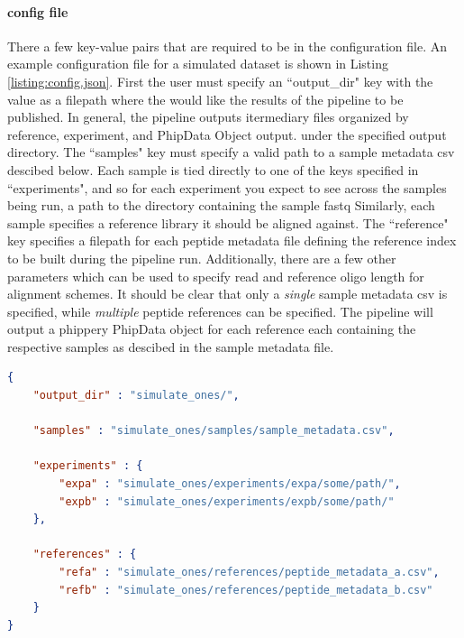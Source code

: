 \documentclass{article}
\begin{document}
\paragraph{config file}
There a few key-value pairs that are required to be in the configuration file. 
An example configuration file for a simulated dataset is shown in Listing \ref{listing:config.json}.
First the user must specify an ``output\_dir" key with the value as a filepath where the would like the results of the pipeline to be published.
In general, the pipeline outputs itermediary files organized by reference, experiment, and PhipData Object output.
under the specified output directory. The ``samples" key must specify a valid path to a sample metadata csv descibed below. 
Each sample is tied directly to one of the keys specified in ``experiments", 
and so for each experiment you expect to see across the samples being run, a path to the directory containing the sample fastq 
Similarly, each sample specifies a reference library it should be aligned against.
The ``reference" key specifies a filepath for each peptide metadata file defining the reference index to be built during the pipeline run.
Additionally, there are a few other parameters which can be used to specify read and reference oligo length for alignment schemes.
It should be clear that only a \textit{single} sample metadata csv is specified, while \textit{multiple} peptide references can be specified.
The pipeline will output a phippery PhipData object for each reference each containing the respective samples as descibed in the sample metadata file.

\begin{lstlisting}[language=json,firstnumber=1,caption={An example JSON configuration file for a simulated dataset.},captionpos=b,numbers=none,label=listing:config.json]
{
    "output_dir" : "simulate_ones/",

    "samples" : "simulate_ones/samples/sample_metadata.csv",

    "experiments" : {
        "expa" : "simulate_ones/experiments/expa/some/path/",
        "expb" : "simulate_ones/experiments/expb/some/path/"
    },

    "references" : {
        "refa" : "simulate_ones/references/peptide_metadata_a.csv",
        "refb" : "simulate_ones/references/peptide_metadata_b.csv"
    }
}
\end{lstlisting}
\end{document}
